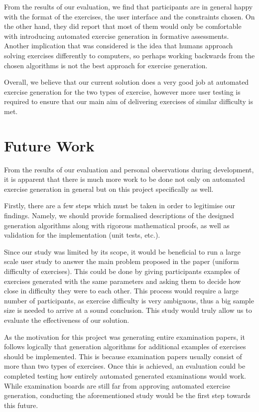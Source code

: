 \documentclass{l4proj}
\begin{document}
From the results of our evaluation, we find that participants are in general happy with the format of the exercises, the user interface and the constraints chosen. On the other hand, they did report that most of them would only be comfortable with introducing automated exercise generation in formative assessments. Another implication that was considered is the idea that humans approach solving exercises differently to computers, so perhaps working backwards from the chosen algorithms is not the best approach for exercise generation.

Overall, we believe that our current solution does a very good job at automated exercise generation for the two types of exercise, however more user testing is required to ensure that our main aim of delivering exercises of similar difficulty is met.

\section{Future Work}
\label{sec:future_work}

From the results of our evaluation and personal observations during development, it is apparent that there is much more work to be done not only on automated exercise generation in general but on this project specifically as well.

Firstly, there are a few steps which must be taken in order to legitimise our findings. Namely, we should provide formalised descriptions of the designed generation algorithms along with rigorous mathematical proofs, as well as validation for the implementation (unit tests, etc.). 

Since our study was limited by its scope, it would be beneficial to run a large scale user study to answer the main problem proposed in the paper (uniform difficulty of exercises). This could be done by giving participants examples of exercises generated with the same parameters and asking them to decide how close in difficulty they were to each other. This process would require a large number of participants, as exercise difficulty is very ambiguous, thus a big sample size is needed to arrive at a sound conclusion. This study would truly allow us to evaluate the effectiveness of our solution.

As the motivation for this project was generating entire examination papers, it follows logically that generation algorithms for additional examples of exercises should be implemented. This is because examination papers usually consist of more than two types of exercises. Once this is achieved, an evaluation could be completed testing how entirely automated generated examinations would work. While examination boards are still far from approving automated exercise generation, conducting the aforementioned study would be the first step towards this future.
\end{document}
